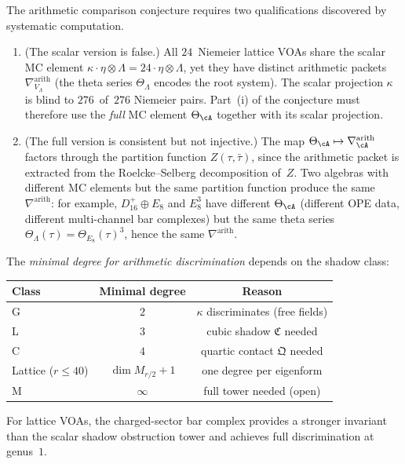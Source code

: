 \begin{remark}%
\label{rem:arithmetic-comparison-sharpening}%
\ClaimStatusProvedHere%
%
%
%
The arithmetic comparison conjecture requires two qualifications
discovered by systematic computation.

\begin{enumerate}[label=\textup{(\roman*)}]
\item \textup{(The scalar version is false.)}
All $24$~Niemeier lattice VOAs share the scalar MC element
$\kappa \cdot \eta \otimes \Lambda = 24 \cdot \eta \otimes \Lambda$,
yet they have distinct arithmetic packets
$\nabla_{V_\Lambda}^{\mathrm{arith}}$
\textup{(}the theta series $\Theta_\Lambda$ encodes
the root system\textup{)}.
The scalar projection $\kappa$ is blind to
$276$~of~$276$ Niemeier pairs.
Part~\textup{(i)} of the conjecture must therefore use the
\emph{full} MC element $\Theta_\cA$ together with its scalar
projection.

\item \textup{(The full version is consistent but not injective.)}
The map $\Theta_\cA \mapsto \nabla_\cA^{\mathrm{arith}}$
factors through the partition function $Z(\tau, \bar\tau)$,
since the arithmetic packet is extracted from the
Roelcke--Selberg decomposition of~$Z$.
Two algebras with different MC elements but the same
partition function produce the same
$\nabla^{\mathrm{arith}}$: for example,
$D_{16}^+ \oplus E_8$ and $E_8^3$ have different
$\Theta_\cA$ \textup{(}different OPE data, different
multi-channel bar complexes\textup{)} but the same
theta series $\Theta_\Lambda(\tau) = \Theta_{E_8}(\tau)^3$,
hence the same $\nabla^{\mathrm{arith}}$.
\end{enumerate}

The \emph{minimal degree for arithmetic discrimination}
depends on the shadow class:
\begin{center}
\small
\renewcommand{\arraystretch}{1.2}
\begin{tabular}{lcc}
\toprule
\textbf{Class} & \textbf{Minimal degree} & \textbf{Reason} \\
\midrule
G & $2$ & $\kappa$ discriminates (free fields) \\
L & $3$ & cubic shadow $\mathfrak{C}$ needed \\
C & $4$ & quartic contact $\mathfrak{Q}$ needed \\
Lattice ($r \leq 40$) & $\dim M_{r/2} + 1$ &
 one degree per eigenform \\
M & $\infty$ & full tower needed (open) \\
\bottomrule
\end{tabular}
\end{center}
For lattice VOAs, the charged-sector bar complex provides
a stronger invariant than the scalar shadow obstruction tower and
achieves full discrimination at genus~$1$.
\end{remark}


